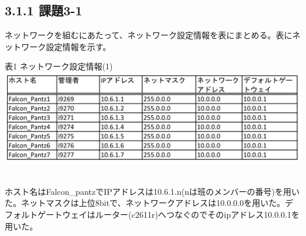 \documentclass[12pt]{jreport}
\begin{document}
            \subsection*{3.1.1 課題3-1}
                ネットワークを組むにあたって、ネットワーク設定情報を表にまとめる。表にネットワーク設定情報を示す。\newpage
                \begin{center}
                    表1 ネットワーク設定情報(1)
                    \includegraphics[width=18cm]{3_1.png} \\　\\
                \end{center}
                ホスト名はFalcon\_pantzでIPアドレスは10.6.1.n(nは班のメンバーの番号)を用いた。ネットマスクは上位8bitで、ネットワークアドレスは10.0.0.0を用いた。デフォルトゲートウェイはルーター(c2611r)へつなぐのでそのipアドレス10.0.0.1を用いた。
\end{document}
